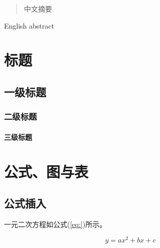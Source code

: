 \documentclass[
    Print       = false,
    Title       = 中国海洋大学硕博学位论文LaTeX模板,
    Author      = 作者,
    Advisor     = 指导教师,
    Thesis      = 全日制专业学位,
    Major       = 专业名称,
    Topic       = 研究方向,
    Year        = 2021,
    Month       = 5,
    Day         = 12,
    TitleEng    = {{LaTeX Template for Master's and Doctoral Dissertations of Ocean University of China}}
]{oucthesis}
\begin{document}
    \makefrontcover
    
    
    \makesign
    
    \makecopyright

    \begin{abstract}
        中文摘要

    \end{abstract}

    \begin{enabstract}
        English abstract
    \end{enabstract}
    
    \tableofcontents
    
    \mainmatter

    \chapter{标题}

    \section{一级标题}

    \subsection{二级标题}

    \subsubsection{三级标题}

    \chapter{公式、图与表}

    \section{公式插入}

    一元二次方程如公式(\ref{eq:})所示。

    \begin{equation}
        y=ax^2+bx+c
        \label{eq:}
    \end{equation}
\end{document}
